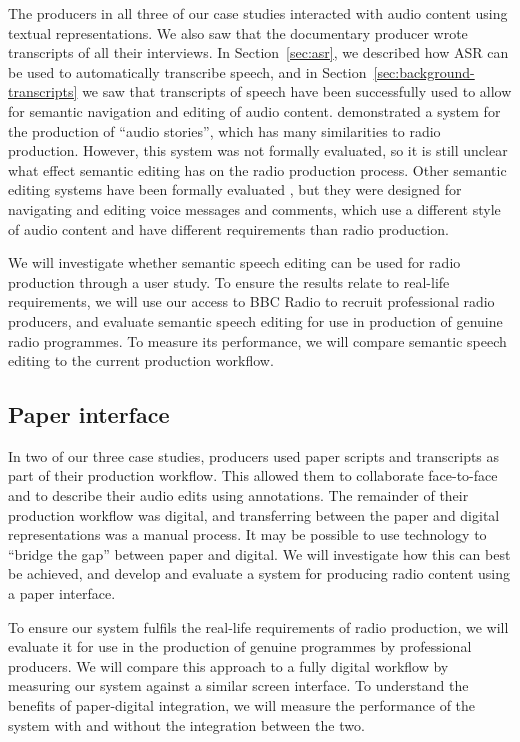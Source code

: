 The producers in all three of our case studies interacted with audio content using textual representations. We also saw
that the documentary producer wrote transcripts of all their interviews.  In Section~\ref{sec:asr}, we described how
ASR can be used to automatically transcribe speech, and in Section~\ref{sec:background-transcripts} we saw that
transcripts of speech have been successfully used to allow for semantic navigation and editing of audio content.
\citet{Rubin2013} demonstrated a system for the production of ``audio stories'', which has many similarities to radio
production.  However, this system was not formally evaluated, so it is still unclear what effect semantic editing has
on the radio production process. Other semantic editing systems have been formally evaluated
\citep{Whittaker2004,Yoon2014,Sivaraman2016}, but they were designed for navigating and editing voice messages and
comments, which use a different style of audio content and have different requirements than radio production.

We will investigate whether semantic speech editing can be used for radio production through a user study.
To ensure the results relate to real-life requirements, we will use our access to BBC Radio to recruit professional
radio producers, and evaluate semantic speech editing for use in production of genuine radio programmes.
To measure its performance, we will compare semantic speech editing to the current production workflow.

\subsection{Paper interface}

In two of our three case studies, producers used paper scripts and transcripts as part of their production workflow.
This allowed them to collaborate face-to-face and to describe their audio edits using annotations. The remainder of
their production workflow was digital, and transferring between the paper and digital representations was a manual
process. It may be possible to use technology to ``bridge the gap'' between paper and digital. We will investigate how
this can best be achieved, and develop and evaluate a system for producing radio content using a paper interface.

To ensure our system fulfils the real-life requirements of radio production, we will evaluate it for use in the
production of genuine programmes by professional producers.  We will compare this approach to a fully digital workflow
by measuring our system against a similar screen interface. To understand the benefits of paper-digital integration, we
will measure the performance of the system with and without the integration between the two.
